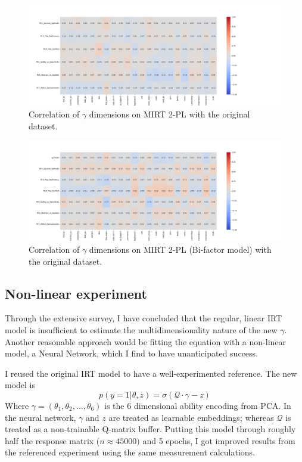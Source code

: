 \begin{figure}[!t]
    \centering
    \includegraphics[width=\linewidth]{figures/PCA_testscore_corr.png}
    \caption{Correlation of $\gamma$ dimensions on MIRT 2-PL with the original dataset.}
    \label{fig:PCA_testscore_corr}
\end{figure}

\begin{figure}[!t]
    \centering
    \includegraphics[width=\linewidth]{figures/PCA_g_testscore_corr.png}
    \caption{Correlation of $\gamma$ dimensions on MIRT 2-PL (Bi-factor model) with the original dataset.}
    \label{fig:PCA_g_testscore_corr}
\end{figure}

\subsection{Non-linear experiment}
Through the extensive survey, I have concluded that the regular, linear IRT model is insufficient to estimate the multidimensionality nature of the new $\gamma$. Another reasonable approach would be fitting the equation with a non-linear model, a Neural Network, which I find to have unanticipated success.

I reused the original IRT model to have a well-experimented reference. The new model is
\[
p(y=1|\theta, z)=\sigma(\mathcal{Q} \cdot \gamma - z)
\]
Where $\gamma=(\theta_1, \theta_2, \ldots, \theta_6)$ is the 6 dimensional ability encoding from PCA. In the neural network, $\gamma$ and $z$ are treated as learnable embeddings; whereas $\mathcal{Q}$ is treated as a non-trainable Q-matrix buffer. Putting this model through roughly half the response matrix ($n \approx 45000)$ and 5 epochs, I got improved results from the referenced experiment using the same measurement calculations.


